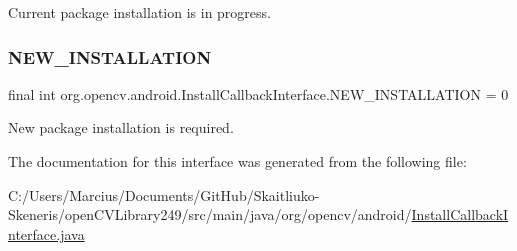 Current package installation is in progress. \mbox{\label{interfaceorg_1_1opencv_1_1android_1_1_install_callback_interface_ad04e1ef7ec6ca29f561c40cc7aa1ace7}} 
\subsubsection{\texorpdfstring{N\+E\+W\+\_\+\+I\+N\+S\+T\+A\+L\+L\+A\+T\+I\+ON}{NEW\_INSTALLATION}}
{\footnotesize\ttfamily final int org.\+opencv.\+android.\+Install\+Callback\+Interface.\+N\+E\+W\+\_\+\+I\+N\+S\+T\+A\+L\+L\+A\+T\+I\+ON = 0\hspace{0.3cm}{\ttfamily [static]}}

New package installation is required. 

The documentation for this interface was generated from the following file\+:\begin{DoxyCompactItemize}
\item 
C\+:/\+Users/\+Marcius/\+Documents/\+Git\+Hub/\+Skaitliuko-\/\+Skeneris/open\+C\+V\+Library249/src/main/java/org/opencv/android/\mbox{\hyperlink{_install_callback_interface_8java}{Install\+Callback\+Interface.\+java}}\end{DoxyCompactItemize}
